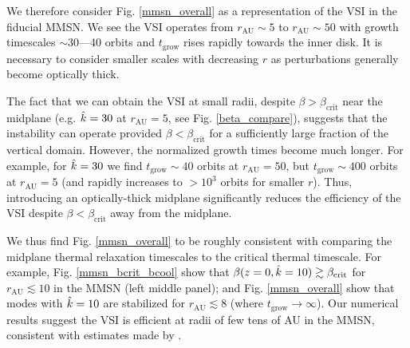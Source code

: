 
We therefore consider Fig. \ref{mmsn_overall} as a representation of the
VSI in the fiducial MMSN. We see the VSI operates from
$r_\mathrm{AU}\sim 5$ to $r_\mathrm{AU}\sim 
50$ with growth timescales $\sim 30$---40 orbits and  
$t_\mathrm{grow}$ rises rapidly towards the inner disk. It is
necessary to consider smaller scales with decreasing $r$ as
perturbations generally become optically thick.   

The fact that we can obtain the VSI at small radii, despite $\beta >
\beta_\mathrm{crit}$ near the midplane (e.g. $\hat{k} = 30$ at
$r_\mathrm{AU} =5$, see Fig. \ref{beta_compare}), suggests  that the
instability can operate provided $\beta < \beta_\mathrm{crit}$ for a
sufficiently large fraction of the vertical domain. However, the
normalized growth times become much longer. For example, for
$\hat{k}=30$ we find $t_\mathrm{grow}\sim 40$ orbits at
$r_\mathrm{AU}=50$, but $t_\mathrm{grow}\sim 400$ orbits at
$r_\mathrm{AU}=5$ (and rapidly increases to $> 10^3$ orbits for
smaller $r$). Thus, introducing an optically-thick midplane
significantly reduces the efficiency of the VSI despite $\beta <
\beta_\mathrm{crit}$ away from the midplane.  


We thus find Fig. \ref{mmsn_overall} to be roughly consistent with
comparing the midplane thermal relaxation timescales to the critical
thermal timescale. For example, 
Fig. \ref{mmsn_bcrit_bcool} show that $\beta(z=0,\hat{k}=10) \gtrsim
\beta_\mathrm{crit}$ for $r_\mathrm{AU}\lesssim 10$ in the MMSN (left middle
panel); and Fig. \ref{mmsn_overall} 
show that modes with $\hat{k}=10$ are stabilized for $r_\mathrm{AU}\lesssim 8$ (where
$t_\mathrm{grow}\to\infty$). Our numerical results suggest the VSI
is efficient at radii of few tens of AU in the MMSN, consistent with 
estimates made by . 


